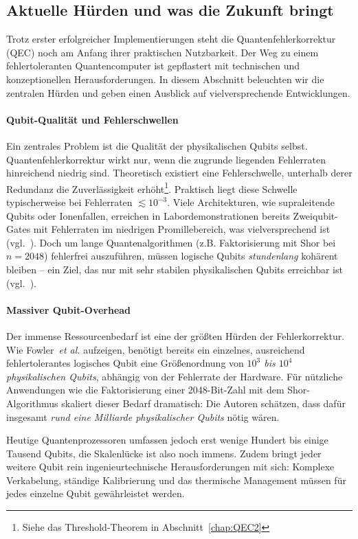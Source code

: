 \subsection{Aktuelle H\"urden und was die Zukunft bringt}\label{chap:QEC3.3}

Trotz erster erfolgreicher Implementierungen steht die Quantenfehlerkorrektur (QEC) noch am Anfang ihrer praktischen Nutzbarkeit. Der Weg zu einem fehlertoleranten Quantencomputer ist gepflastert mit technischen und konzeptionellen Herausforderungen. In diesem Abschnitt beleuchten wir die zentralen H\"urden und geben einen Ausblick auf vielversprechende Entwicklungen.
\medskip
\paragraph{Qubit-Qualit\"at und Fehlerschwellen} 
Ein zentrales Problem ist die Qualit\"at der physikalischen Qubits selbst. Quantenfehlerkorrektur wirkt nur, wenn die zugrunde liegenden Fehlerraten hinreichend niedrig sind. Theoretisch existiert eine Fehlerschwelle, unterhalb derer Redundanz die Zuverl\"assigkeit erh\"oht\footnote{Siehe das Threshold-Theorem in Abschnitt~\ref{chap:QEC2}}. Praktisch liegt diese Schwelle typischerweise bei Fehlerraten $\lesssim 10^{-3}$. Viele Architekturen, wie supraleitende Qubits oder Ionenfallen, erreichen in Labordemonstrationen bereits Zweiqubit-Gates mit Fehlerraten im niedrigen Promillebereich, was vielversprechend ist (vgl.~\cite{noauthor_quantinuum_2022}). Doch um lange Quantenalgorithmen (z.B. Faktorisierung mit Shor bei $n=2048$) fehlerfrei auszuf\"uhren, m\"ussen logische Qubits \emph{stundenlang} koh\"arent bleiben -- ein Ziel, das nur mit sehr stabilen physikalischen Qubits erreichbar ist (vgl.~\cite{gidney_how_2021}).
\medskip
\paragraph{Massiver Qubit-Overhead}
Der immense Ressourcenbedarf ist eine der größten Hürden der Fehlerkorrektur. 
Wie Fowler~\textit{et al.} aufzeigen, benötigt bereits ein einzelnes, 
ausreichend fehlertolerantes logisches Qubit eine Größenordnung von 
\emph{$10^3$ bis $10^4$ physikalischen Qubits}, abhängig von der Fehlerrate der Hardware. 
Für nützliche Anwendungen wie die Faktorisierung einer 2048-Bit-Zahl mit dem Shor-Algorithmus 
skaliert dieser Bedarf dramatisch: Die Autoren schätzen, dass dafür insgesamt 
\emph{rund eine Milliarde physikalischer Qubits} nötig wären.

Heutige Quantenprozessoren umfassen jedoch erst wenige Hundert bis einige Tausend Qubits, die Skalenlücke ist also noch immens. Zudem bringt jeder weitere Qubit rein 
ingenieurtechnische Herausforderungen mit sich: Komplexe Verkabelung, 
ständige Kalibrierung und das thermische Management müssen für jedes einzelne 
Qubit gewährleistet werden.
\medskip
